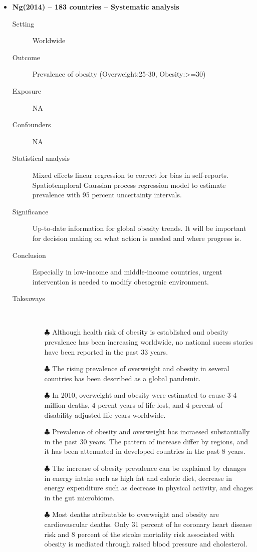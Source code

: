 \documentclass{article}
\begin{document}
\begin{itemize}
\newpage
\item{\bf Ng(2014) -- 183 countries -- Systematic analysis} 
		\begin{description}
			\item[Setting] Worldwide 
			\item[Outcome] Prevalence of obesity (Overweight:25-30, Obesity:>=30) 
			\item[Exposure] NA 
			\item[Confounders] NA 
			\item[Statistical analysis] Mixed effects linear regression to correct for bias in self-reports. Spatiotemploral Gaussian process regression model to estimate prevalence with 95 percent uncertainty intervals. 
			\item[Significance] Up-to-date information for global obesity trends. It will be important for decision making on what action is needed and where progress is. 
			\item[Conclusion] Especially in low-income and middle-income countries, urgent intervention is needed to modify obesogenic environment. 
			\item[Takeaways] \mbox{}\\
				\begin{itemize}
					\item[$\clubsuit$] Although health risk of obesity is established and obesity prevalence has been increasing worldwide, no national sucess stories have been reported in the past 33 years. 
					\item[$\clubsuit$] The rising prevalence of overweight and obesity in several countries has been described as a global pandemic.  
					\item[$\clubsuit$] In 2010, overweight and obesity were estimated to cause 3-4 million deaths, 4 perent years of life lost, and 4 percent of disability-adjusted life-years worldwide. 
					\item[$\clubsuit$] Prevalence of obesity and overweight has incraesed substantially in the past 30 years. The pattern of increase differ by regions, and it has been attenuated in developed countries in the past 8 years.
					\item[$\clubsuit$] The increase of obesity prevalence can be explained by changes in energy intake such as high fat and calorie diet, decrease in energy expenditure such as decrease in physical activity, and chages in the gut microbiome.
					\item[$\clubsuit$] Most deaths atributable to overweight and obesity are cardiovascular deaths. Only 31 percent of he coronary heart disease risk and 8 percent of the stroke mortality risk associated with obesity is mediated through raised blood pressure and cholesterol.
				\end{itemize} 
			

\end{description}
\end{itemize}
\end{document}
